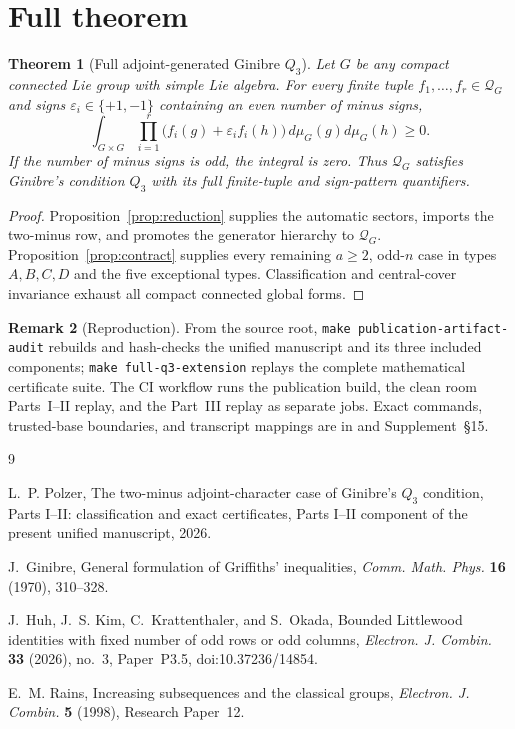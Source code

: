 \documentclass[10pt,reqno]{amsart}
\newtheorem{theorem}{Theorem}[section]
\theoremstyle{definition}
\newtheorem{remark}[theorem]{Remark}
\newcommand{\Qcone}{\mathcal Q}
\begin{document}
\section{Full theorem}

\begin{theorem}[Full adjoint-generated Ginibre $Q_3$]
\label{thm:main}
Let $G$ be any compact connected Lie group with simple Lie algebra.  For
every finite tuple $f_1,\ldots,f_r\in\Qcone_G$ and signs
$\varepsilon_i\in\{+1,-1\}$ containing an even number of minus signs,
\[
 \int_{G\times G}\prod_{i=1}^{r}
 \bigl(f_i(g)+\varepsilon_i f_i(h)\bigr)
 \,d\mu_G(g)d\mu_G(h)\geq0.
\]
If the number of minus signs is odd, the integral is zero.  Thus
$\Qcone_G$ satisfies Ginibre's condition $Q_3$ with its full finite-tuple
and sign-pattern quantifiers.
\end{theorem}

\begin{proof}
Proposition~\ref{prop:reduction} supplies the automatic sectors, imports the
two-minus row, and promotes the generator hierarchy to $\Qcone_G$.
Proposition~\ref{prop:contract} supplies every remaining $a\geq2$, odd-$n$
case in types $A,B,C,D$ and the five exceptional types.  Classification and
central-cover invariance exhaust all compact connected global forms.
\end{proof}

\begin{remark}[Reproduction]
From the source root, \texttt{make publication-artifact-audit} rebuilds and
hash-checks the unified manuscript and its three included components;
\texttt{make full-q3-extension} replays the complete mathematical
certificate suite.  The CI workflow runs the publication build, the clean
room Parts~I--II replay, and the Part~III replay as separate
jobs.  Exact commands, trusted-base boundaries, and transcript mappings are
in  and Supplement~\S15.
\end{remark}

\begin{thebibliography}{9}

L.~P. Polzer,
The two-minus adjoint-character case of Ginibre's $Q_3$ condition,
Parts I--II: classification and exact certificates, Parts I--II component of
the present unified manuscript, 2026.

J.~Ginibre,
General formulation of Griffiths' inequalities,
\emph{Comm. Math. Phys.} \textbf{16} (1970), 310--328.

J.~Huh, J.~S. Kim, C.~Krattenthaler, and S.~Okada,
Bounded Littlewood identities with fixed number of odd rows or odd columns,
\emph{Electron. J. Combin.} \textbf{33} (2026), no.~3, Paper~P3.5,
doi:10.37236/14854.

E.~M. Rains,
Increasing subsequences and the classical groups,
\emph{Electron. J. Combin.} \textbf{5} (1998), Research Paper~12.

\end{thebibliography}
\end{document}
